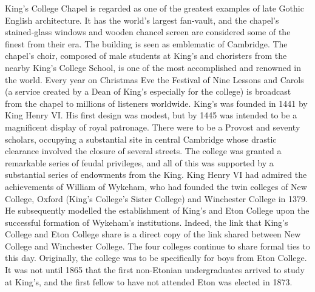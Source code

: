 King's College Chapel is regarded as one of the greatest examples of late Gothic English architecture. It has the world's largest fan-vault, and the chapel's stained-glass windows and wooden chancel screen are considered some of the finest from their era. The building is seen as emblematic of Cambridge. The chapel's choir, composed of male students at King's and choristers from the nearby King's College School, is one of the most accomplished and renowned in the world. Every year on Christmas Eve the Festival of Nine Lessons and Carols (a service created by a Dean of King's especially for the college) is broadcast from the chapel to millions of listeners worldwide. King's was founded in 1441 by King Henry VI. His first design was modest, but by 1445 was intended to be a magnificent display of royal patronage. There were to be a Provost and seventy scholars, occupying a substantial site in central Cambridge whose drastic clearance involved the closure of several streets. The college was granted a remarkable series of feudal privileges, and all of this was supported by a substantial series of endowments from the King. King Henry VI had admired the achievements of William of Wykeham, who had founded the twin colleges of New College, Oxford (King's College's Sister College) and Winchester College in 1379. He subsequently modelled the establishment of King's and Eton College upon the successful formation of Wykeham's institutions. Indeed, the link that King's College and Eton College share is a direct copy of the link shared between New College and Winchester College. The four colleges continue to share formal ties to this day. Originally, the college was to be specifically for boys from Eton College. It was not until 1865 that the first non-Etonian undergraduates arrived to study at King's, and the first fellow to have not attended Eton was elected in 1873. \\

